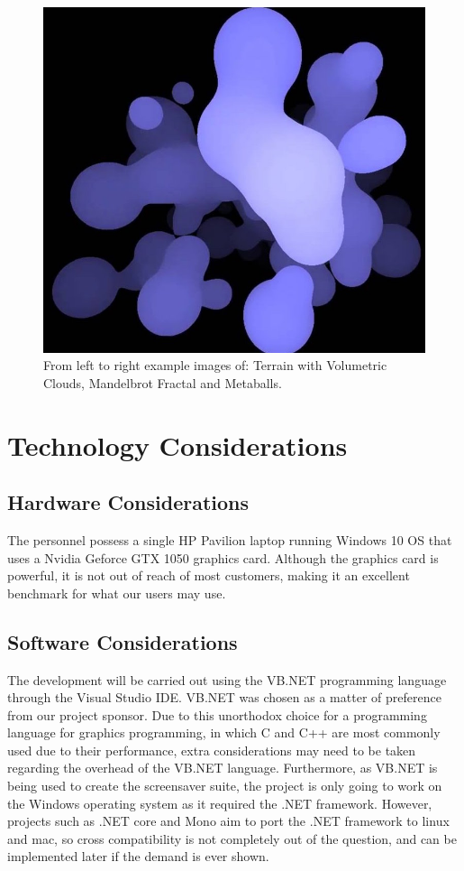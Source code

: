 \documentclass[10pt, openany]{book}
\begin{document}
\begin{figure}[H]
\begin{minipage}{.3\textwidth}
  \includegraphics[width=.9\linewidth]{metaballs}
\end{minipage}
\caption{From left to right example images of: Terrain with Volumetric Clouds, Mandelbrot Fractal and Metaballs.}
\end{figure}	

\section{Technology Considerations}

\subsection{Hardware Considerations}

The personnel possess a single HP Pavilion laptop running Windows 10 OS that uses a Nvidia Geforce GTX 1050 graphics card. Although the graphics card is powerful, it is not out of reach of most customers, making it an excellent benchmark for what our users may use.

\subsection{Software Considerations}

The development will be carried out using the VB.NET programming language through the Visual Studio IDE. VB.NET was chosen as a matter of preference from our project sponsor. Due to this unorthodox choice for a programming language for graphics programming, in which C and C++ are most commonly used due to their performance, extra considerations may need to be taken regarding the overhead of the VB.NET language. Furthermore, as VB.NET is being used to create the screensaver suite, the project is only going to work on the Windows operating system as it required the .NET framework. However, projects such as .NET core and Mono aim to port the .NET framework to linux and mac, so cross compatibility is not completely out of the question, and can be implemented later if the demand is ever shown. 
\end{document}
